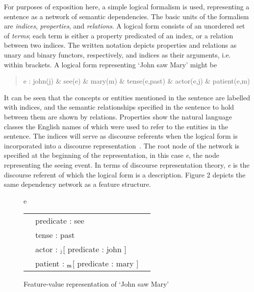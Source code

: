 For purposes of exposition here, a simple logical formalism is used,
representing
a sentence as a network of semantic dependencies. The basic units of the
formalism are
{\it indices},
{\it properties},
and
{\it relations}.
A logical form consists of an unordered set of
{\it terms};
each term is either a property predicated of an index, or a relation between
two indices. The written notation depicts properties and relations as
unary and binary functors, respectively, and indices as their arguments,
i.e. within brackets. A logical form representing `John saw Mary' might
be
\begin{quote}
  \smallskip
  \small
  e : john(j) \& see(e) \& mary(m) \& tense(e,past) \&
  actor(e,j) \& patient(e,m)
\end{quote}
It can be seen that the concepts or entities mentioned in the sentence
are labelled with indices, and the semantic relationships specified in
the sentence to hold between them are shown by relations. Properties
show the natural language classes the English names of which were used
to refer to the entities in the sentence.
The indices will serve as discourse referents when the logical form is
incorporated into a discourse representation~\cite{kamp:81:a}.
The root node of the network is specified at the beginning of the
representation, in this case
{\it e},
the node representing the seeing event. In terms of discourse
representation theory,
{\it e\/}
is the discourse referent of which the logical form is a
description. Figure 2 depicts the same dependency network as a feature
structure.

\begin{figure}[htbp]
  \begin{center}
    \leavevmode
    \small
    e
    \begin{tabular}[b]{|@{\hspace*{-1.5mm}}clc@{\hspace*{-1.5mm}}|}
      \cline{1-1}\cline{3-3}
      & predicate : see &\\
      & tense : past & \\
      & actor : $_{\rm j}\,\!$[ predicate : john ] & \\
      & patient : $_{\rm m}\,\!$[ predicate : mary ] & \\
      \cline{1-1}\cline{3-3}
    \end{tabular}
    \caption{Feature-value representation of `John saw Mary'}
  \end{center}
\end{figure}

